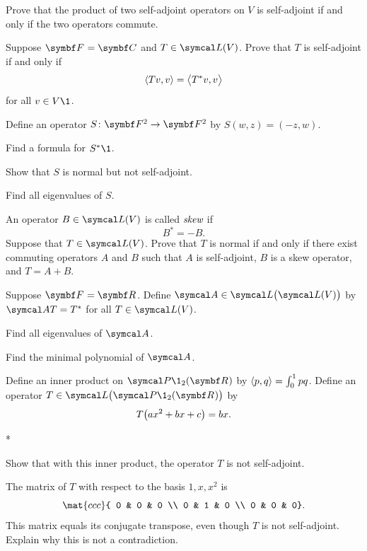 \begin{exercises}
\exercise
Prove that the product of two self-adjoint operators on $V$ is self-adjoint if and only if the two operators commute.


\exercise
Suppose $\F{} = \C{}$ and $T \in \L(V)$. Prove that $T$ is self-adjoint if and only if
\[
\ip{Tv, v} = \ip[\big]{T^*v, v}
\]
for all $v \in V\1$.


\pagebreak[3]

\exercise
Define an operator $\fun S {\F 2} {\F 2}$ by $S(w, z) = (-z, w)$.
\begin{subtheorem}
\item
Find a formula for $S^*\1$.
\item
Show that $S$ is normal but not self-adjoint.
\item
Find all eigenvalues of $S$.
\end{subtheorem}


\exercise
An operator $B \in \L(V)$ is called $\emph{skew}$ if
\[
B^* = -B.
\]
Suppose that \mbox{$T \in \L(V)$}. Prove that $T$ is normal if and only if there exist commuting operators $A$ and $B$ such that $A$ is self-adjoint, $B$ is a skew operator, and $T = A + B$. \label{skewadj} 


\exercise
Suppose $\F{} = \R{}$. Define $\A \in \L\paren[\big]{\L(V)}$ by $\A T = T^*$ for all $T \in \L(V)$.
\begin{subtheorem}
\item
Find all eigenvalues of $\A$.
\item
Find the minimal polynomial of $\A$.
\end{subtheorem}
\exercisesubtheoremend


\exercise
Define an inner product on $\P\1_2(\R{})$ by
$
\ip{p,q} = \int_0^1 pq$.
Define an operator $T \in \L\bigl(\P\1_2(\R{})\bigr)$ by
\[
T\paren[\big]{a x^2 + bx + c} = b x.
\]
\begin{subtheorem}*
\item
Show that with this inner product, the operator $T$ is not self-adjoint.
\item
The matrix of $T$ with respect to the basis $1, x, x^2$ is
\[
\mat{ccc}{
0 & 0 & 0 \\
0 & 1 & 0 \\
0 & 0 & 0}.
\]
This matrix equals its conjugate transpose, even though $T$ is not self-adjoint.
Explain why this is not a contradiction.
\end{subtheorem}
\exercisesubtheoremend



\end{exercises}
